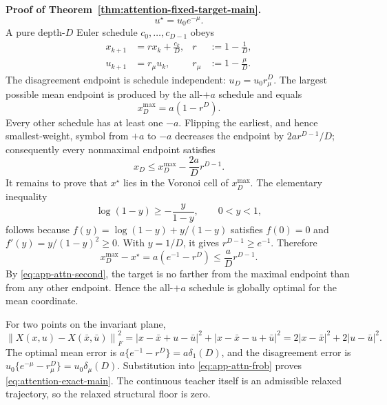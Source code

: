 \documentclass[twoside,11pt]{article}
\renewenvironment{proof}[1][Proof]{\par\noindent\textbf{#1.}\ }{\hfill\BlackBox\par\medskip}
\newcommand{\norm}[1]{\left\lVert #1\right\rVert}
\begin{document}
\begin{proof}[Proof of Theorem~\ref{thm:attention-fixed-target-main}]
\begin{equation}
 u^\star=u_0e^{-\mu}.
 \label{eq:app-attn-teacher}
\end{equation}
A pure depth-$D$ Euler schedule $c_0,\ldots,c_{D-1}$ obeys
\begin{align}
 x_{k+1}&=r x_k+\frac{c_k}{D},
 &r&:=1-\frac1D,\nonumber\\
 u_{k+1}&=r_\mu u_k,
 &r_\mu&:=1-\frac\mu D.
 \label{eq:app-attn-euler}
\end{align}
The disagreement endpoint is schedule independent:
$u_D=u_0r_\mu^D$.  The largest possible mean endpoint is produced by the
all-$+a$ schedule and equals
\begin{equation}
 x_D^{\max}=a(1-r^D).
 \label{eq:app-attn-xmax}
\end{equation}
Every other schedule has at least one $-a$.  Flipping the earliest, and hence
smallest-weight, symbol from $+a$ to $-a$ decreases the endpoint by
$2ar^{D-1}/D$; consequently every nonmaximal endpoint satisfies
\begin{equation}
 x_D\le x_D^{\max}-\frac{2a}{D}r^{D-1}.
 \label{eq:app-attn-second}
\end{equation}
It remains to prove that $x^\star$ lies in the Voronoi cell of
$x_D^{\max}$.  The elementary inequality
\begin{equation}
 \log(1-y)\ge-\frac{y}{1-y},
 \qquad 0<y<1,
 \label{eq:app-log-ineq}
\end{equation}
follows because $f(y)=\log(1-y)+y/(1-y)$ satisfies $f(0)=0$ and
$f'(y)=y/(1-y)^2\ge0$.  With $y=1/D$, it gives $r^{D-1}\ge e^{-1}$.  Therefore
\begin{equation}
 x_D^{\max}-x^\star
 =a(e^{-1}-r^D)
 \le\frac{a}{D}r^{D-1}.
 \label{eq:app-attn-voronoi}
\end{equation}
By \eqref{eq:app-attn-second}, the target is no farther from the maximal
endpoint than from any other endpoint.  Hence the all-$+a$ schedule is
globally optimal for the mean coordinate.

For two points on the invariant plane,
\begin{equation}
 \norm{X(x,u)-X(\bar x,\bar u)}_F^2
 =|x-\bar x+u-\bar u|^2+|x-\bar x-u+\bar u|^2
 =2|x-\bar x|^2+2|u-\bar u|^2.
 \label{eq:app-attn-frob}
\end{equation}
The optimal mean error is
$a\{e^{-1}-r^D\}=a\delta_1(D)$, and the disagreement error is
$u_0\{e^{-\mu}-r_\mu^D\}=u_0\delta_\mu(D)$.  Substitution into
\eqref{eq:app-attn-frob} proves \eqref{eq:attention-exact-main}.
The continuous teacher itself is an admissible relaxed trajectory, so the
relaxed structural floor is zero.


\end{proof}
\end{document}
